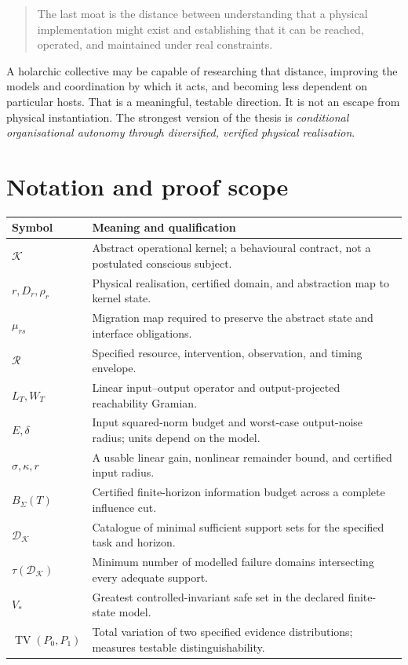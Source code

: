 \documentclass[11pt,a4paper]{article}
\theoremstyle{definition}
\theoremstyle{remark}
\newcommand{\calR}{\mathcal{R}}
\newcommand{\calK}{\mathcal{K}}
\DeclareMathOperator{\TV}{TV}
\begin{document}
\begin{quote}
The last moat is the distance between understanding that a physical implementation might exist and establishing that it can be reached, operated, and maintained under real constraints.
\end{quote}
A holarchic collective may be capable of researching that distance, improving the models and coordination by which it acts, and becoming less dependent on particular hosts. That is a meaningful, testable direction. It is not an escape from physical instantiation. The strongest version of the thesis is \emph{conditional organisational autonomy through diversified, verified physical realisation}.

\appendix
\section{Notation and proof scope}\label{app:notation}
\begin{longtable}{@{}>{\raggedright\arraybackslash}p{}>{\raggedright\arraybackslash}p{}@{}}
\toprule
Symbol & Meaning and qualification\\
\midrule
\endhead
$\calK$ & Abstract operational kernel; a behavioural contract, not a postulated conscious subject.\\
$r,D_r,\rho_r$ & Physical realisation, certified domain, and abstraction map to kernel state.\\
$\mu_{rs}$ & Migration map required to preserve the abstract state and interface obligations.\\
$\calR$ & Specified resource, intervention, observation, and timing envelope.\\
$L_T,W_T$ & Linear input--output operator and output-projected reachability Gramian.\\
$E,\delta$ & Input squared-norm budget and worst-case output-noise radius; units depend on the model.\\
$\sigma,\kappa,r$ & A usable linear gain, nonlinear remainder bound, and certified input radius.\\
$B_\Sigma(T)$ & Certified finite-horizon information budget across a complete influence cut.\\
$\mathscr D_{\calK}$ & Catalogue of minimal sufficient support sets for the specified task and horizon.\\
$\tau(\mathscr D_{\calK})$ & Minimum number of modelled failure domains intersecting every adequate support.\\
$V_*$ & Greatest controlled-invariant safe set in the declared finite-state model.\\
$\TV(P_0,P_1)$ & Total variation of two specified evidence distributions; measures testable distinguishability.\\
\bottomrule
\end{longtable}
\end{document}
